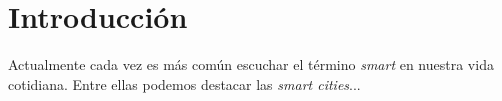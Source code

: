 


\section{Introducci\'on}\label{sec:intro}
\pagestyle{headings}

Actualmente cada vez es m\'as com\'un escuchar el t\'ermino
\emph{smart} en nuestra vida cotidiana. Entre ellas podemos destacar
las \emph{smart cities}...
